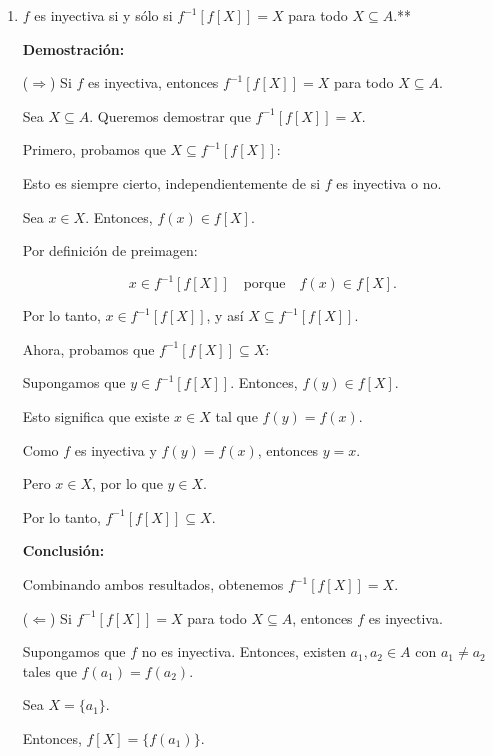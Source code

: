 \begin{solution}
   \begin{enumerate}
    \item \( f \) es inyectiva si y sólo si \( f^{-1}[f[X]] = X \) para todo \( X \subseteq A \).**
    
    \textbf{Demostración:}
    
    ($\Rightarrow$) Si \( f \) es inyectiva, entonces \( f^{-1}[f[X]] = X \) para todo \( X \subseteq A \).
    
    Sea \( X \subseteq A \). Queremos demostrar que \( f^{-1}[f[X]] = X \).
    
    Primero, probamos que \( X \subseteq f^{-1}[f[X]] \):
    
    Esto es siempre cierto, independientemente de si \( f \) es inyectiva o no.
    
    Sea \( x \in X \). Entonces, \( f(x) \in f[X] \).
    
    Por definición de preimagen:
    
    \[x \in f^{-1}[f[X]] \quad \text{porque} \quad f(x) \in f[X].\]
    
    Por lo tanto, \( x \in f^{-1}[f[X]] \), y así \( X \subseteq f^{-1}[f[X]] \).
    
    Ahora, probamos que \( f^{-1}[f[X]] \subseteq X \):
    
    Supongamos que \( y \in f^{-1}[f[X]] \). Entonces, \( f(y) \in f[X] \).
    
    Esto significa que existe \( x \in X \) tal que \( f(y) = f(x) \).
    
    Como \( f \) es inyectiva y \( f(y) = f(x) \), entonces \( y = x \).
    
    Pero \( x \in X \), por lo que \( y \in X \).
    
    Por lo tanto, \( f^{-1}[f[X]] \subseteq X \).
    
    \textbf{Conclusión:}
    
    Combinando ambos resultados, obtenemos \( f^{-1}[f[X]] = X \).
    
    ($\Leftarrow$) Si \( f^{-1}[f[X]] = X \) para todo \( X \subseteq A \), entonces \( f \) es inyectiva.
    
    Supongamos que \( f \) no es inyectiva. Entonces, existen \( a_1, a_2 \in A \) con \( a_1 \neq a_2 \) tales que \( f(a_1) = f(a_2) \).
    
    Sea \( X = \{ a_1 \} \).
    
    Entonces, \( f[X] = \{ f(a_1) \} \).
    

\end{enumerate}
\end{solution}
